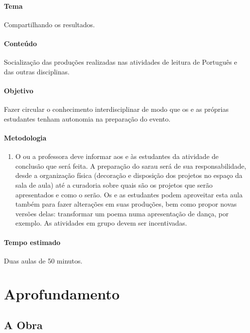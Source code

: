 \documentclass[12pt]{extarticle}
\begin{document}
\paragraph{Tema} Compartilhando os resultados.

\paragraph{Conteúdo} Socialização das produções realizadas nas atividades de leitura de Português e das outras disciplinas.

\paragraph{Objetivo} Fazer circular o conhecimento interdisciplinar de modo
que os e as próprias estudantes tenham autonomia na preparação do evento.


\paragraph{Metodologia}

\begin{enumerate}

  \item
  O ou a professora deve informar aos e às estudantes da atividade de conclusão que será feita.
  A preparação do sarau será de sua responsabilidade, desde a organização física
  (decoração e disposição dos projetos no espaço da sala de aula) até a curadoria
  sobre quais são os projetos que serão apresentados e como o serão. Os e as estudantes
  podem aproveitar esta aula também para fazer alterações em suas produções, bem 
  como propor novas versões delas: transformar um poema numa apresentação de dança, por exemplo.
  As atividades em grupo devem ser incentivadas. 

\end{enumerate}

\paragraph{Tempo estimado} Duas aulas de 50 minutos.


\section{Aprofundamento}


\subsection{A Obra}
\end{document}
